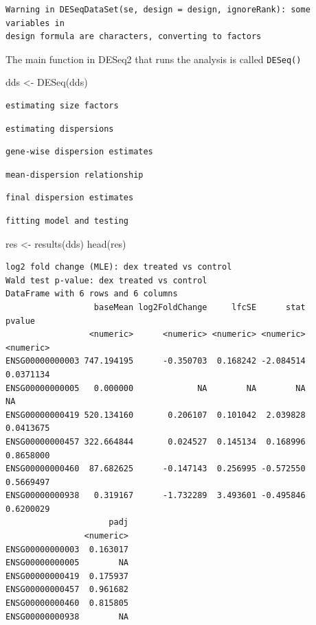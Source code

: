 \documentclass[
  letterpaper,
  DIV=11,
  numbers=noendperiod]{scrartcl}
\newenvironment{Shaded}{\begin{snugshade}}{\end{snugshade}}
\newcommand{\FunctionTok}[1]{\textcolor[rgb]{0.28,0.35,0.67}{#1}}
\newcommand{\NormalTok}[1]{\textcolor[rgb]{0.00,0.23,0.31}{#1}}
\newcommand{\OtherTok}[1]{\textcolor[rgb]{0.00,0.23,0.31}{#1}}
\begin{document}
\begin{verbatim}
Warning in DESeqDataSet(se, design = design, ignoreRank): some variables in
design formula are characters, converting to factors
\end{verbatim}

The main function in DESeq2 that runs the analysis is called
\texttt{DESeq()}

\begin{Shaded}
\begin{Highlighting}[]
\NormalTok{dds }\OtherTok{\textless{}{-}} \FunctionTok{DESeq}\NormalTok{(dds)}
\end{Highlighting}
\end{Shaded}

\begin{verbatim}
estimating size factors
\end{verbatim}

\begin{verbatim}
estimating dispersions
\end{verbatim}

\begin{verbatim}
gene-wise dispersion estimates
\end{verbatim}

\begin{verbatim}
mean-dispersion relationship
\end{verbatim}

\begin{verbatim}
final dispersion estimates
\end{verbatim}

\begin{verbatim}
fitting model and testing
\end{verbatim}

\begin{Shaded}
\begin{Highlighting}[]
\NormalTok{res }\OtherTok{\textless{}{-}} \FunctionTok{results}\NormalTok{(dds)}
\FunctionTok{head}\NormalTok{(res)}
\end{Highlighting}
\end{Shaded}

\begin{verbatim}
log2 fold change (MLE): dex treated vs control 
Wald test p-value: dex treated vs control 
DataFrame with 6 rows and 6 columns
                  baseMean log2FoldChange     lfcSE      stat    pvalue
                 <numeric>      <numeric> <numeric> <numeric> <numeric>
ENSG00000000003 747.194195      -0.350703  0.168242 -2.084514 0.0371134
ENSG00000000005   0.000000             NA        NA        NA        NA
ENSG00000000419 520.134160       0.206107  0.101042  2.039828 0.0413675
ENSG00000000457 322.664844       0.024527  0.145134  0.168996 0.8658000
ENSG00000000460  87.682625      -0.147143  0.256995 -0.572550 0.5669497
ENSG00000000938   0.319167      -1.732289  3.493601 -0.495846 0.6200029
                     padj
                <numeric>
ENSG00000000003  0.163017
ENSG00000000005        NA
ENSG00000000419  0.175937
ENSG00000000457  0.961682
ENSG00000000460  0.815805
ENSG00000000938        NA
\end{verbatim}
\end{document}

